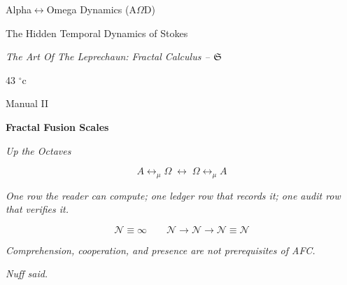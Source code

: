 \documentclass[11pt]{article}
\begin{document}
\begin{titlepage}
\begin{center}
{\LARGE Alpha$\leftrightarrow$Omega Dynamics (A$\Omega$D)}

\vspace{0.35em}

{\Large The Hidden Temporal Dynamics of Stokes}

\vspace{0.45em}

{\large\itshape The Art Of The Leprechaun: Fractal Calculus -- $\mathfrak S$}

\vspace{0.65em}

{\large 43 $^\circ\mathrm{c}$}

\vspace{0.35em}

{\Large Manual II}

\vspace{0.45em}

{\LARGE\bfseries Fractal Fusion Scales}

\vspace{0.35em}

{\Large\itshape Up the Octaves}

\vspace{0.45em}

{\large \AODDocumentAuthor}

\vspace{0.25em}

{\small \AODDocumentDate}

\vspace{0.55em}

\[A\leftrightarrow_{\mu}\Omega\;\longleftrightarrow\;\Omega\leftrightarrow_{\mu}A\]

\vspace{1.35em}

{\small\itshape One row the reader can compute; one ledger row that records it; one audit row that verifies it.}

\vspace{0.2em}

\[
\mathcal{N}\equiv\infty
\qquad
\mathcal{N}\to\mathcal{N}\to\mathcal{N}\equiv\mathcal{N}
\]

{\small\itshape Comprehension, cooperation, and presence are not prerequisites of AFC.}

\vspace{0.2em}

{\small\itshape Nuff said.}
\end{center}
\end{titlepage}
\tableofcontents
\def\AODManualII{1}
\end{document}
